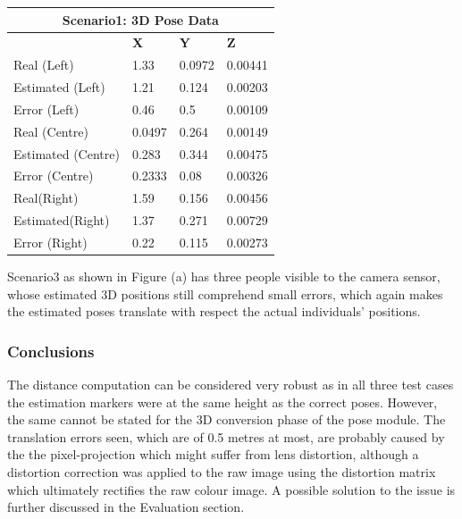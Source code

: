 \begin{table}[H]
  \centering
  \begin{tabular}{ |p{4cm}|p{2cm}|p{2cm}|p{2cm}|  }
    \hline
    \multicolumn{4}{|c|}{Scenario1: 3D Pose Data} \\
    \hline
    & \textbf{X} & \textbf{Y} & \textbf{Z} \\
    \hline
    Real (Left) & 1.33 & 0.0972 & 0.00441 \\
    Estimated (Left) & 1.21 & 0.124 & 0.00203 \\
    Error (Left) & 0.46 & 0.5 & 0.00109 \\
    \hline
    Real (Centre) & 0.0497 & 0.264 & 0.00149 \\
    Estimated (Centre) & 0.283 & 0.344 & 0.00475 \\
    Error (Centre) & 0.2333 & 0.08 & 0.00326 \\
    \hline
    Real(Right) & 1.59 & 0.156 & 0.00456 \\
    Estimated(Right) & 1.37 & 0.271 & 0.00729 \\
    Error (Right) & 0.22 & 0.115 & 0.00273 \\
    \hline
  \end{tabular}
\end{table}

Scenario3 as shown in Figure (a) has three people visible to the camera sensor, whose estimated 3D positions still comprehend small errors, which again makes the estimated poses translate with respect the actual individuals' positions.

\subsubsection{Conclusions}

The distance computation can be considered very robust as in all three test cases the estimation markers were at the same height as the correct poses. However, the same cannot be stated for the 3D conversion phase of the pose module. The translation errors seen, which are of 0.5 metres at most, are probably caused by the the pixel-projection which might suffer from lens distortion, although a distortion correction was applied to the raw image using the distortion matrix which ultimately rectifies the raw colour image. A possible solution to the issue is further discussed in the Evaluation section.
